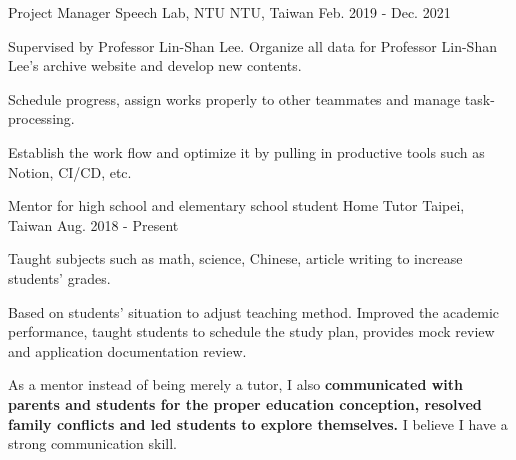 

\begin{cventries}

  \cventry
    {Project Manager} %
    {Speech Lab, NTU} %
    {NTU, Taiwan} %
    {Feb. 2019 - Dec. 2021} %
    {
      \begin{cvitems} %
        \item {Supervised by Professor Lin-Shan Lee. Organize all data for Professor Lin-Shan Lee's archive website and develop new contents.}
        \item {Schedule progress, assign works properly to other teammates and manage task-processing.}
        \item {Establish the work flow and optimize it by pulling in productive tools such as Notion, CI/CD, etc.}
      \end{cvitems}
    }

  \cventry
    {Mentor for high school and elementary school student} %
    {Home Tutor} %
    {Taipei, Taiwan} %
    {Aug. 2018 - Present} %
    {
      \begin{cvitems} %
        \item {Taught subjects such as math, science, Chinese, article writing
            to increase students' grades.}
        \item {Based on students' situation to adjust teaching method. 
                Improved the academic performance, taught students to schedule the study plan,
              provides mock review and application documentation review.}
        \item {As a mentor instead of being merely a tutor, I also
            \textbf{communicated with parents and students for the
                proper education conception, 
        resolved family conflicts and led students to explore themselves.} I believe I have a strong communication skill.}
      \end{cvitems}
    }

 

\end{cventries}
